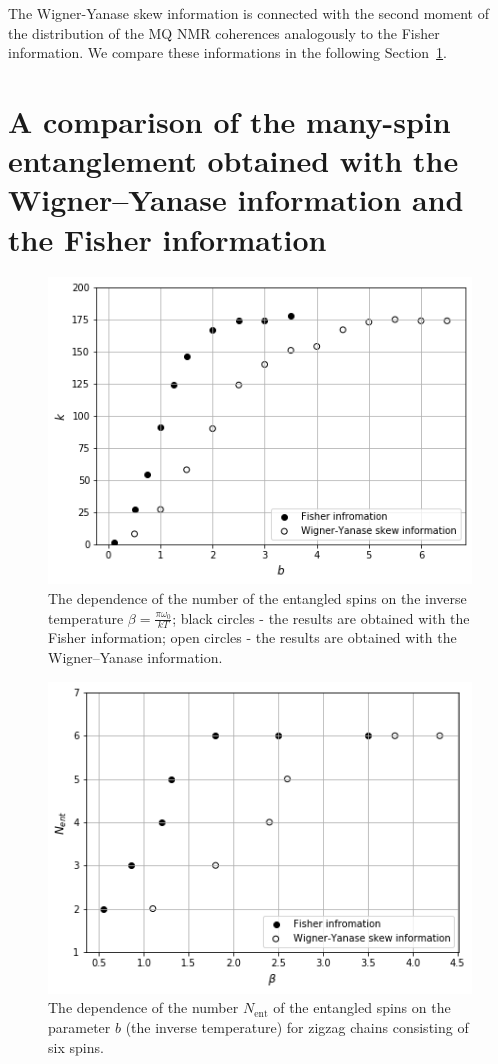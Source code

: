 \documentclass[preprint,12pt]{elsarticle}
\begin{document}
The Wigner-Yanase skew information is connected with the second moment of the distribution of the MQ NMR coherences analogously to the Fisher information.
We compare these informations in the following Section~\ref{sec:4}.


\section{A comparison of the many-spin entanglement obtained with the Wigner--Yanase information and the Fisher information}
\label{sec:4}

\begin{figure}
	\includegraphics[width=0.95\linewidth]{nanopora_entangled_spins_by_temp}
	\caption{
		The dependence of the number of the entangled spins on the inverse temperature $\beta = \frac{\pi \omega_0}{kT}$;
		black circles - the results are obtained with the Fisher information;
		open circles - the results are obtained with the Wigner--Yanase information.
	}
	\label{fig:2}
\end{figure}

\begin{figure}
	\includegraphics[width=0.95\linewidth]{zigzag_entangled_spins_by_temp}
	\caption{
		The dependence of the number $N_\mathrm{ent}$ of the entangled spins on the parameter $b$ (the inverse temperature) for zigzag chains consisting of six spins.
	}
	\label{fig:3}
\end{figure}
\end{document}
